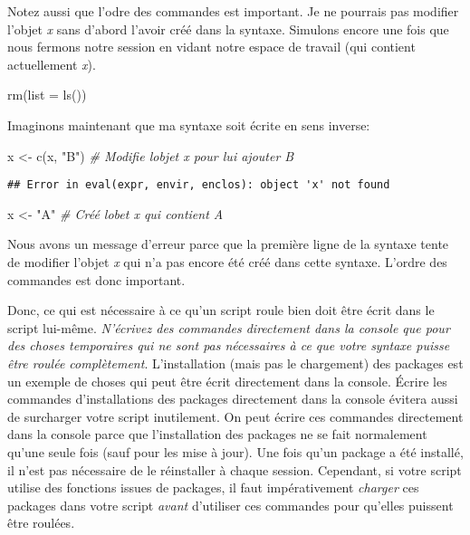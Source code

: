 \documentclass[
]{book}
\newenvironment{Shaded}{\begin{snugshade}}{\end{snugshade}}
\newcommand{\AttributeTok}[1]{\textcolor[rgb]{0.77,0.63,0.00}{#1}}
\newcommand{\CommentTok}[1]{\textcolor[rgb]{0.56,0.35,0.01}{\textit{#1}}}
\newcommand{\FunctionTok}[1]{\textcolor[rgb]{0.00,0.00,0.00}{#1}}
\newcommand{\NormalTok}[1]{#1}
\newcommand{\OtherTok}[1]{\textcolor[rgb]{0.56,0.35,0.01}{#1}}
\newcommand{\StringTok}[1]{\textcolor[rgb]{0.31,0.60,0.02}{#1}}
\begin{document}
Notez aussi que l'odre des commandes est important. Je ne pourrais pas modifier l'objet \emph{x} sans d'abord l'avoir créé dans la syntaxe. Simulons encore une fois que nous fermons notre session en vidant notre espace de travail (qui contient actuellement \emph{x}).

\begin{Shaded}
\begin{Highlighting}[]
\FunctionTok{rm}\NormalTok{(}\AttributeTok{list =} \FunctionTok{ls}\NormalTok{())}
\end{Highlighting}
\end{Shaded}

Imaginons maintenant que ma syntaxe soit écrite en sens inverse:

\begin{Shaded}
\begin{Highlighting}[]
\NormalTok{x }\OtherTok{\textless{}{-}} \FunctionTok{c}\NormalTok{(x, }\StringTok{"B"}\NormalTok{) }\CommentTok{\# Modifie l\textquotesingle{}objet x pour lui ajouter B}
\end{Highlighting}
\end{Shaded}

\begin{verbatim}
## Error in eval(expr, envir, enclos): object 'x' not found
\end{verbatim}

\begin{Shaded}
\begin{Highlighting}[]
\NormalTok{x }\OtherTok{\textless{}{-}} \StringTok{"A"} \CommentTok{\# Créé l\textquotesingle{}obet x qui contient A}
\end{Highlighting}
\end{Shaded}

Nous avons un message d'erreur parce que la première ligne de la syntaxe tente de modifier l'objet \emph{x} qui n'a pas encore été créé dans cette syntaxe. L'ordre des commandes est donc important.

Donc, ce qui est nécessaire à ce qu'un script roule bien doit être écrit dans le script lui-même. \emph{N'écrivez des commandes directement dans la console que pour des choses temporaires qui ne sont pas nécessaires à ce que votre syntaxe puisse être roulée complètement}. L'installation (mais pas le chargement) des packages est un exemple de choses qui peut être écrit directement dans la console. Écrire les commandes d'installations des packages directement dans la console évitera aussi de surcharger votre script inutilement. On peut écrire ces commandes directement dans la console parce que l'installation des packages ne se fait normalement qu'une seule fois (sauf pour les mise à jour). Une fois qu'un package a été installé, il n'est pas nécessaire de le réinstaller à chaque session. Cependant, si votre script utilise des fonctions issues de packages, il faut impérativement \emph{charger} ces packages dans votre script \emph{avant} d'utiliser ces commandes pour qu'elles puissent être roulées.
\end{document}
